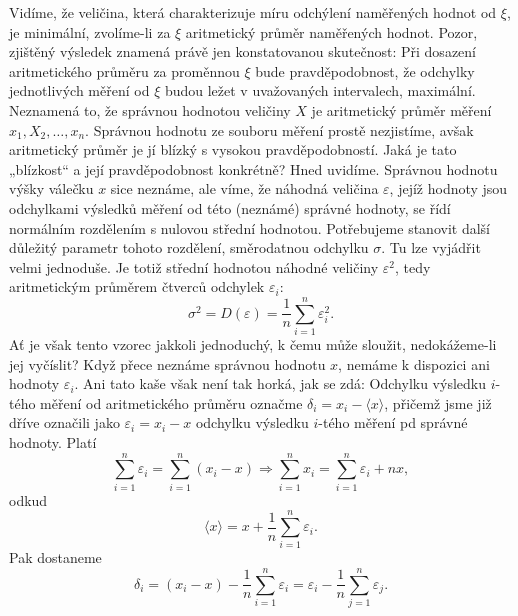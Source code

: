      Vidíme, že veličina, která charakterizuje míru odchýlení naměřených hodnot od \(\xi\), je 
      minimální, zvolíme-li za \(\xi\) aritmetický průměr naměřených hodnot. Pozor, zjištěný 
      výsledek znamená právě jen konstatovanou skutečnost: Při dosazení aritmetického průměru za 
      proměnnou \(\xi\) bude pravděpodobnost, že odchylky jednotlivých měření od \(\xi\) budou 
      ležet v uvažovaných intervalech, maximální. Neznamená to, že správnou hodnotou veličiny \(X\) 
      je aritmetický průměr měření \(x_1, X_2, \ldots, x_n\). Správnou hodnotu ze souboru měření 
      prostě nezjistíme, avšak aritmetický průměr je jí blízký s vysokou pravděpodobností. Jaká je 
      tato „blízkost“ a její pravděpodobnost konkrétně? Hned uvidíme. Správnou hodnotu výšky 
      válečku \(x\) sice neznáme, ale víme, že náhodná veličina \(\varepsilon\), jejíž hodnoty jsou 
      odchylkami výsledků měření od této (neznámé) správné hodnoty, se řídí normálním rozdělením s 
      nulovou střední hodnotou. Potřebujeme stanovit další důležitý parametr tohoto rozdělení, 
      směrodatnou odchylku \(\sigma\). Tu lze vyjádřit velmi jednoduše. Je totiž střední hodnotou 
      náhodné veličiny \(\varepsilon^2\), tedy aritmetickým průměrem čtverců odchylek 
      \(\varepsilon_i\): 
      \begin{equation*}
        \sigma^2 = D(\varepsilon) = \dfrac{1}{n}\sum_{i=1}^{n}\varepsilon_i^2.
      \end{equation*}
      Ať je však tento vzorec jakkoli jednoduchý, k čemu může sloužit, nedokážeme-li jej vyčíslit?
      Když přece neznáme správnou hodnotu \(x\), nemáme k dispozici ani hodnoty \(\varepsilon_i\). 
      Ani tato kaše však není tak horká, jak se zdá: Odchylku výsledku \(i\)-tého měření od 
      aritmetického průměru označme \(\delta_i = x_i - \langle x \rangle\), přičemž jsme již dříve 
      označili jako \(\varepsilon_i= x_i - x\) odchylku výsledku \(i\)-tého měření pd správné 
      hodnoty. Platí
      \begin{equation*}
        \sum_{i=1}^{n}\varepsilon_i = \sum_{i=1}^{n}(x_i - x) \Rightarrow 
        \sum_{i=1}^{n}x_i = \sum_{i=1}^{n}\varepsilon_i + nx, 
      \end{equation*}
      odkud 
      \begin{equation*}
        \langle x \rangle = x + \dfrac{1}{n}\sum_{i=1}^{n}\varepsilon_i.
      \end{equation*}
      Pak dostaneme
      \begin{equation*}
        \delta_i = (x_i - x) - \dfrac{1}{n}\sum_{i=1}^{n}\varepsilon_i 
                 = \varepsilon_i - \dfrac{1}{n}\sum_{j=1}^{n}\varepsilon_j.
      \end{equation*}
